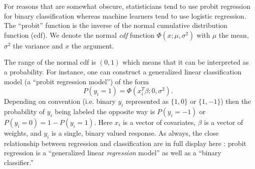 
%
%




%
%
For reasons that are somewhat obscure, statisticians tend to use probit regression for binary classification whereas machine learners tend to use logistic regression.
 The ``probit'' function is the inverse of the normal cumulative distribution function (cdf).    We denote the normal {\em cdf} function $\Phi(x;\mu,\sigma^2)$ with $\mu$ the mean, $\sigma^2$ the variance and $x$ the argument.

The range of the normal cdf is $(0,1)$ which means that it can be interpreted as a probability.  For instance, one can construct a generalized linear classification model (a ``probit regression model'') of the form 
\begin{equation}
P(y_i = 1) = \Phi(x_i^T\beta; 0, \sigma^2). \label{eqn:probit}
\end{equation}  Depending on convention (i.e. binary $y_i$ represented as $\{1,0\}$ or $\{1,-1\}$) then the probability of $y_i$ being labeled the opposite way is $P(y_i = -1)$ or $P(y_i = 0) = 1 - P(y_i=1).$  Here $x_i$ is a vector of covariates, $\beta$ is a vector of weights, and $y_i$ is a single, binary valued response.  As always, the close relationship between regression and classification are in full display here : probit regression is a ``generalized linear {\em regression} model'' as well as a ``binary classifier.''

